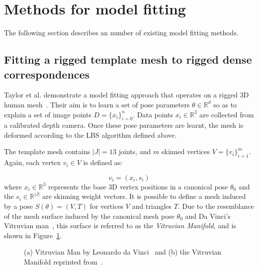         \clearpage
        \section{Methods for model fitting}
        The following section describes an number of existing model fitting methods.

        \subsection{Fitting a rigged template mesh to rigged dense correspondences}
        Taylor et al. demonstrate a model fitting approach that operates on a rigged 3D human mesh~\cite{taylor2012vitruvian}. Their aim is to learn a set of pose parameters $\theta \in \mathbb{R}^{d}$ so as to explain a set of image points $D = \{x_{i}\}_{i=0}^{n}$. Data points $x_{i} \in \mathbb{R}^{3}$ are collected from a calibrated depth camera. Once these pose parameters are learnt, the mesh is deformed according to the LBS algorithm defined above.

        The template mesh contains $|J| = 13$ joints, and $m$ skinned vertices ${V} = \{v_{i}\}_{i=1}^{m}$. Again, each vertex $v_{i} \in V$ is defined as:
        
        \begin{equation}
            v_{i} = (x_{i}, s_{i})
        \end{equation}
        where $x_{i} \in \mathbb{R}^{3}$ represents the base 3D vertex positions in a canonical pose $\theta_{0}$ and the $s_{i} \in \mathbb{R}^{|J|}$ are skinning weight vectors. It is possible to define a mesh induced by a pose $S(\theta) = (V, T)$ for vertices $V$ and triangles $T$. Due to the resemblance of the mesh surface induced by the canonical mesh pose $\theta_{0}$ and Da Vinci's Vitruvian man~\cite{davinci}, this surface is referred to as the \emph{Vitruvian Manifold}, and is shown in Figure~\ref{fig:vitruvian_man}. 
        
        \begin{figure}[H] %
            \caption{(a) Vitruvian Man by Leonardo da Vinci~\cite{davinci} and (b) the Vitruvian Manifold reprinted from~\cite{taylor2012vitruvian}.}
            \label{fig:vitruvian_man}
        \end{figure}

